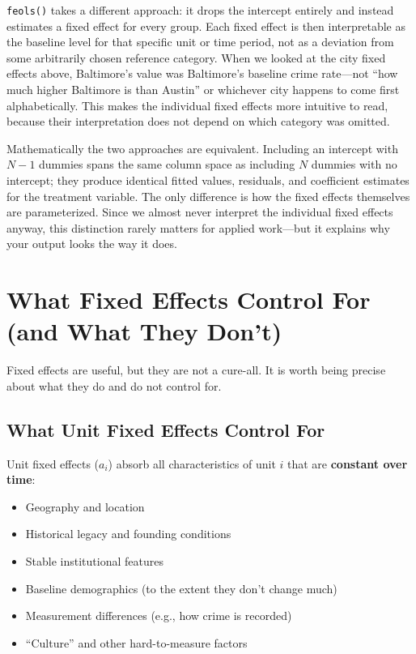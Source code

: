 \documentclass[
  letterpaper,
  DIV=11,
  numbers=noendperiod]{scrreprt}
\providecommand{\tightlist}{%
  \setlength{\itemsep}{0pt}\setlength{\parskip}{0pt}}
\begin{document}
\texttt{feols()} takes a different approach: it drops the intercept
entirely and instead estimates a fixed effect for every group. Each
fixed effect is then interpretable as the baseline level for that
specific unit or time period, not as a deviation from some arbitrarily
chosen reference category. When we looked at the city fixed effects
above, Baltimore's value was Baltimore's baseline crime rate---not ``how
much higher Baltimore is than Austin'' or whichever city happens to come
first alphabetically. This makes the individual fixed effects more
intuitive to read, because their interpretation does not depend on which
category was omitted.

Mathematically the two approaches are equivalent. Including an intercept
with \(N - 1\) dummies spans the same column space as including \(N\)
dummies with no intercept; they produce identical fitted values,
residuals, and coefficient estimates for the treatment variable. The
only difference is how the fixed effects themselves are parameterized.
Since we almost never interpret the individual fixed effects anyway,
this distinction rarely matters for applied work---but it explains why
your output looks the way it does.

\section{What Fixed Effects Control For (and What They
Don't)}\label{what-fixed-effects-control-for-and-what-they-dont}

Fixed effects are useful, but they are not a cure-all. It is worth being
precise about what they do and do not control for.

\subsection{What Unit Fixed Effects Control
For}\label{what-unit-fixed-effects-control-for}

Unit fixed effects (\(a_i\)) absorb all characteristics of unit \(i\)
that are \textbf{constant over time}:

\begin{itemize}
\tightlist
\item
  Geography and location
\item
  Historical legacy and founding conditions
\item
  Stable institutional features
\item
  Baseline demographics (to the extent they don't change much)
\item
  Measurement differences (e.g., how crime is recorded)
\item
  ``Culture'' and other hard-to-measure factors
\end{itemize}
\end{document}

